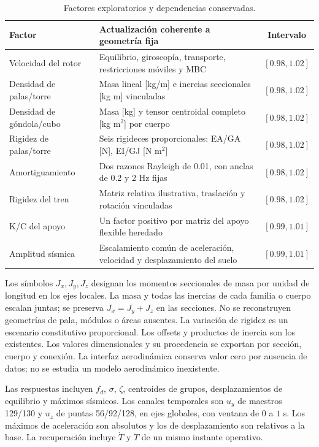 \documentclass[11pt,a4paper]{article}
\begin{document}
\begin{table}[htbp]
\centering\small
\caption{Factores exploratorios y dependencias conservadas.}\label{tab:param}
\begin{tabular}{>{\raggedright\arraybackslash}p{3.2cm}>{\raggedright\arraybackslash}p{8.4cm}c}
\toprule
Factor & Actualización coherente a geometría fija & Intervalo\\
\midrule
Velocidad del rotor & Equilibrio, giroscopía, transporte, restricciones móviles y MBC & $[0.98,1.02]$\\
Densidad de palas/torre & Masa lineal [kg/m] e inercias seccionales [kg m] vinculadas & $[0.98,1.02]$\\
Densidad de góndola/cubo & Masa [kg] y tensor centroidal completo [kg m$^2$] por cuerpo & $[0.98,1.02]$\\
Rigidez de palas/torre & Seis rigideces proporcionales: EA/GA [N], EI/GJ [N m$^2$] & $[0.98,1.02]$\\
Amortiguamiento & Dos razones Rayleigh de 0.01, con anclas de 0.2 y 2 Hz fijas & $[0.98,1.02]$\\
Rigidez del tren & Matriz relativa ilustrativa, traslación y rotación vinculadas & $[0.98,1.02]$\\
K/C del apoyo & Un factor positivo por matriz del apoyo flexible heredado & $[0.99,1.01]$\\
Amplitud sísmica & Escalamiento común de aceleración, velocidad y desplazamiento del suelo & $[0.99,1.01]$\\
\bottomrule
\end{tabular}
\end{table}

Los símbolos $J_x,J_y,J_z$ designan los momentos seccionales de masa por unidad de longitud en los ejes locales. La masa y todas las inercias de cada familia o cuerpo escalan juntas; se preserva $J_x=J_y+J_z$ en las secciones. No se reconstruyen geometrías de pala, módulos o áreas ausentes. La variación de rigidez es un escenario constitutivo proporcional. Los offsets y productos de inercia son los existentes. Los valores dimensionales y su procedencia se exportan por sección, cuerpo y conexión. La interfaz aerodinámica conserva valor cero por ausencia de datos; no se estudia un modelo aerodinámico inexistente.

Las respuestas incluyen $f_d$, $\sigma$, $\zeta$, centroides de grupos, desplazamientos de equilibrio y máximos sísmicos. Los canales temporales son $u_y$ de maestros 129/130 y $u_z$ de puntas 56/92/128, en ejes globales, con ventana de $0$ a $1$ s. Los máximos de aceleración son absolutos y los de desplazamiento son relativos a la base. La recuperación incluye $\dot T$ y $\ddot T$ de un mismo instante operativo.
\end{document}
